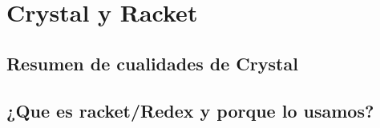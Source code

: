 \setchapterpreamble[u]{\margintoc}
\chapter{Crystal y Racket}

\section{Resumen de cualidades de Crystal}






\section{¿Que es racket/Redex y porque lo usamos?}


